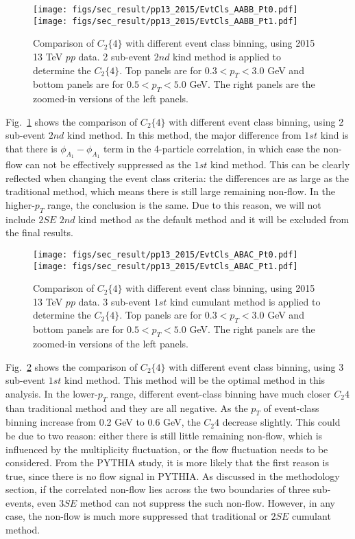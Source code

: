 \begin{figure}[H]
\centering
\texttt{[image: figs/sec\_result/pp13\_2015/EvtCls\_AABB\_Pt0.pdf]}
\texttt{[image: figs/sec\_result/pp13\_2015/EvtCls\_AABB\_Pt1.pdf]}
\caption{Comparison of $C_{2}\{4\}$ with different event class binning, using 2015 13 TeV $pp$ data. 2 sub-event $2nd$ kind method is applied to determine the $C_{2}\{4\}$. Top panels are for $0.3<p_{T}<3.0$ GeV and bottom panels are for $0.5<p_{T}<5.0$ GeV. The right panels are the zoomed-in versions of the left panels.}
\label{fig:result_pp13_2015_EvtCls_AABB}
\end{figure}

Fig.~\ref{fig:result_pp13_2015_EvtCls_AABB} shows the comparison of $C_{2}\{4\}$ with different event class binning, using 2 sub-event $2nd$ kind method. In this method, the major difference from $1st$ kind is that there is $\phi_{A_{1}}-\phi_{A_{1}}$ term in the 4-particle correlation, in which case the non-flow can not be effectively suppressed as the $1st$ kind method. This can be clearly reflected when changing the event class criteria: the differences are as large as the traditional method, which means there is still large remaining non-flow. In the higher-$p_{T}$ range, the conclusion is the same. Due to this reason, we will not include $2SE$ $2nd$ kind method as the default method and it will be excluded from the final results.

\begin{figure}[H]
\centering
\texttt{[image: figs/sec\_result/pp13\_2015/EvtCls\_ABAC\_Pt0.pdf]}
\texttt{[image: figs/sec\_result/pp13\_2015/EvtCls\_ABAC\_Pt1.pdf]}
\caption{Comparison of $C_{2}\{4\}$ with different event class binning, using 2015 13 TeV $pp$ data. 3 sub-event $1st$ kind cumulant method is applied to determine the $C_{2}\{4\}$. Top panels are for $0.3<p_{T}<3.0$ GeV and bottom panels are for $0.5<p_{T}<5.0$ GeV. The right panels are the zoomed-in versions of the left panels.}
\label{fig:result_pp13_2015_EvtCls_ABAC}
\end{figure}

Fig.~\ref{fig:result_pp13_2015_EvtCls_ABAC} shows the comparison of $C_{2}\{4\}$ with different event class binning, using 3 sub-event $1st$ kind method. This method will be the optimal method in this analysis. In the lower-$p_{T}$ range, different event-class binning have much closer $C_{2}{4}$ than traditional method and they are all negative. As the $p_{T}$ of event-class binning increase from 0.2 GeV to 0.6 GeV, the $C_{2}{4}$ decrease slightly. This could be due to two reason: either there is still little remaining non-flow, which is influenced by the multiplicity fluctuation, or the flow fluctuation needs to be considered. From the PYTHIA study, it is more likely that the first reason is true, since there is no flow signal in PYTHIA. As discussed in the methodology section, if the correlated non-flow lies across the two boundaries of three sub-events, even $3SE$ method can not suppress the such non-flow. However, in any case, the non-flow is much more suppressed that traditional or $2SE$ cumulant method.

